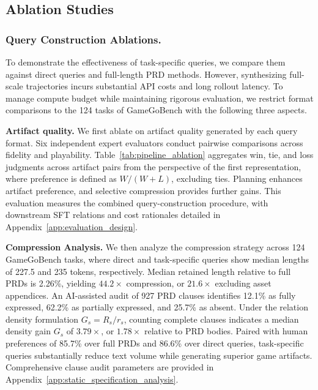 \documentclass{article}
\begin{document}
\vspace{-3pt}
\subsection{Ablation Studies}
\vspace{-3pt}

\subsubsection{Query Construction Ablations.}
\label{sec:ablation_analysis}

\vspace{-3pt}
To demonstrate the effectiveness of task-specific queries, we compare them against direct queries and full-length PRD methods. 
However, synthesizing full-scale trajectories incurs substantial API costs and long rollout latency.
To manage compute budget while maintaining rigorous evaluation, we restrict format comparisons to the 124 tasks of GameGoBench with the following three aspects.

\textbf{Artifact quality.}
We first ablate on artifact quality generated by each query format. Six independent expert evaluators conduct pairwise comparisons across fidelity and playability. Table~\ref{tab:pipeline_ablation} aggregates win, tie, and loss judgments across artifact pairs from the perspective of the first representation, where preference is defined as \(W/(W+L)\), excluding ties. Planning enhances artifact preference, and selective compression provides further gains. This evaluation measures the combined query-construction procedure, with downstream SFT relations and cost rationales detailed in Appendix~\ref{app:evaluation_design}.



\textbf{Compression Analysis.}
\label{sec:static_analysis_results}
We then analyze the compression strategy across 124 GameGoBench tasks, where direct and task-specific queries show median lengths of 227.5 and 235 tokens, respectively. Median retained length relative to full PRDs is 2.26\%, yielding \(44.2\times\) compression, or \(21.6\times\) excluding asset appendices. An AI-assisted audit of 927 PRD clauses identifies 12.1\% as fully expressed, 62.2\% as partially expressed, and 25.7\% as absent. Under the relation density formulation \(G_s = R_s / r_s\), counting complete clauses indicates a median density gain \(G_s\) of \(3.79\times\), or \(1.78\times\) relative to PRD bodies. Paired with human preferences of 85.7\% over full PRDs and 86.6\% over direct queries, task-specific queries substantially reduce text volume while generating superior game artifacts. Comprehensive clause audit parameters are provided in Appendix~\ref{app:static_specification_analysis}.
\end{document}
